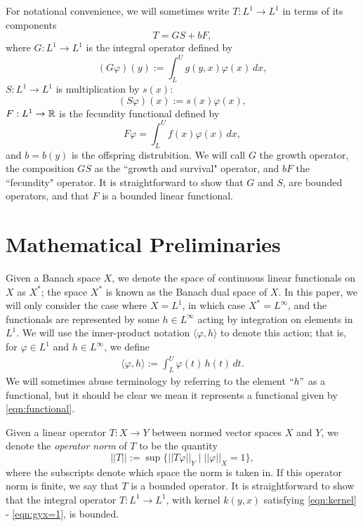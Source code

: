 For notational convenience, we will sometimes write $T:L^1 \to L^1$ in terms of its components
\[T = GS + bF,\]
where $G:L^1 \to L^1$ is the integral operator defined by
\begin{equation}
	(G\varphi)(y) := \int_L^U g(y, x) \varphi(x) \, dx, \label{def:growthop}
\end{equation} 
$S:L^1 \to L^1$ is multiplication by $s(x)$:
\begin{equation}
(S\varphi)(x) := s(x) \varphi(x), \label{def:survop}
\end{equation}
$F:L^1 \to \mathbb{R}$ is the fecundity functional defined by
\begin{equation}
F\varphi = \int_L^U f(x) \varphi(x) \, dx, \label{def:fecfun}
\end{equation}
and $b=b(y)$ is the offspring distrubition. We will call $G$ the growth operator, the composition $GS$ as the ``growth and survival" operator, and $bF$ the ``fecundity" operator. It is straightforward to show that $G$ and $S$, are bounded operators, and that $F$ is a bounded linear functional.

\section{Mathematical Preliminaries} \label{section:mathprelims}

Given a Banach space $X$, we denote the space of continuous linear functionals on $X$ as $X^*$; the space $X^*$ is known as the Banach dual space of $X$. In this paper, we will only consider the case where $X=L^1$, in which case $X^* = L^\infty$, and the functionals are represented by some $h \in L^\infty$ acting by integration on elements in $L^1$. We will use the inner-product notation $\langle \varphi, h \rangle$ to denote this action; that is, for $\varphi \in L^1$ and $h \in L^\infty$, we define
\begin{align}
	\langle \varphi, h \rangle := \int_L^U \varphi(t) \, h(t) \, dt. \label{eqn:functional}
\end{align}
We will sometimes abuse terminology by referring to the element $``h"$ as a functional, but it should be clear we mean it represents a functional given by \eqref{eqn:functional}.

Given a linear operator $T:X \to Y$ between normed vector spaces $X$ and $Y$, we denote the \emph{operator norm} of $T$ to be the quantity
\[||T|| := \sup \{ ||T\varphi||_Y \mid ||\varphi||_X = 1\},\]
where the subscripts denote which space the norm is taken in. If this operator norm is finite, we say that $T$ is a bounded operator. It is straightforward to show that the integral operator $T:L^1 \to L^1$, with kernel $k(y, x)$ satisfying \eqref{eqn:kernel} - \eqref{eqn:gyx=1}, is bounded.


